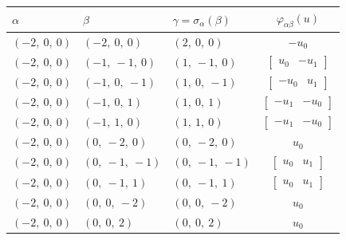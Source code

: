 \documentclass[11pt]{article}
\newcommand{\noi}{\noindent}
\theoremstyle{definition}
\begin{document}
\bigskip

\noi \noindent \begin{longtable}{|l|l|l|c|}
    \hline
    \textbf{$\alpha$} & \textbf{$\beta$} & \textbf{$\gamma = \sigma_{\alpha}(\beta)$} & $\varphi_{\alpha\beta}(u)$ \\
    \hline
    \endhead
    $\left( -2, \  0, \  0\right)$ & $\left( -2, \  0, \  0\right)$ & $\left( 2, \  0, \  0\right)$ & $- u_{0}$ \\
    \hline
    $\left( -2, \  0, \  0\right)$ & $\left( -1, \  -1, \  0\right)$ & $\left( 1, \  -1, \  0\right)$ & $\left[\begin{matrix}u_{0} & - u_{1}\end{matrix}\right]$ \\
    \hline
    $\left( -2, \  0, \  0\right)$ & $\left( -1, \  0, \  -1\right)$ & $\left( 1, \  0, \  -1\right)$ & $\left[\begin{matrix}- u_{0} & u_{1}\end{matrix}\right]$ \\
    \hline
    $\left( -2, \  0, \  0\right)$ & $\left( -1, \  0, \  1\right)$ & $\left( 1, \  0, \  1\right)$ & $\left[\begin{matrix}- u_{1} & - u_{0}\end{matrix}\right]$ \\
    \hline
    $\left( -2, \  0, \  0\right)$ & $\left( -1, \  1, \  0\right)$ & $\left( 1, \  1, \  0\right)$ & $\left[\begin{matrix}- u_{1} & - u_{0}\end{matrix}\right]$ \\
    \hline
    $\left( -2, \  0, \  0\right)$ & $\left( 0, \  -2, \  0\right)$ & $\left( 0, \  -2, \  0\right)$ & $u_{0}$ \\
    \hline
    $\left( -2, \  0, \  0\right)$ & $\left( 0, \  -1, \  -1\right)$ & $\left( 0, \  -1, \  -1\right)$ & $\left[\begin{matrix}u_{0} & u_{1}\end{matrix}\right]$ \\
    \hline
    $\left( -2, \  0, \  0\right)$ & $\left( 0, \  -1, \  1\right)$ & $\left( 0, \  -1, \  1\right)$ & $\left[\begin{matrix}u_{0} & u_{1}\end{matrix}\right]$ \\
    \hline
    $\left( -2, \  0, \  0\right)$ & $\left( 0, \  0, \  -2\right)$ & $\left( 0, \  0, \  -2\right)$ & $u_{0}$ \\
    \hline
    $\left( -2, \  0, \  0\right)$ & $\left( 0, \  0, \  2\right)$ & $\left( 0, \  0, \  2\right)$ & $u_{0}$ \\

\end{longtable}
\end{document}
